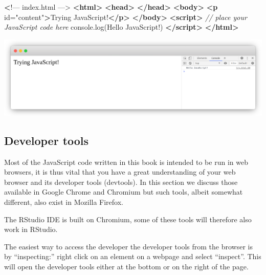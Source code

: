 \documentclass[
]{krantz}
\makeatletter
\newenvironment{Shaded}{\begin{snugshade}}{\end{snugshade}}
\newcommand{\AttributeTok}[1]{\textcolor[rgb]{0.61,0.61,0.61}{#1}}
\newcommand{\CommentTok}[1]{\textcolor[rgb]{0.37,0.37,0.37}{\textit{#1}}}
\newcommand{\ErrorTok}[1]{\textcolor[rgb]{0.14,0.14,0.14}{\textbf{#1}}}
\newcommand{\KeywordTok}[1]{\textcolor[rgb]{0.27,0.27,0.27}{\textbf{#1}}}
\newcommand{\NormalTok}[1]{#1}
\newcommand{\OtherTok}[1]{\textcolor[rgb]{0.37,0.37,0.37}{#1}}
\newcommand{\StringTok}[1]{\textcolor[rgb]{0.5,0.5,0.5}{#1}}
\newcommand{\VariableTok}[1]{\textcolor[rgb]{0,0,0}{#1}}
\newenvironment{kframe}{%
\medskip{}
\setlength{\fboxsep}{.8em}
 \def\at@end@of@kframe{}%
 \ifinner\ifhmode%
  \def\at@end@of@kframe{\end{minipage}}%
  \begin{minipage}{\columnwidth}%
 \fi\fi%
 \def\FrameCommand##1{\hskip\@totalleftmargin \hskip-\fboxsep
 \colorbox{shadecolor}{##1}\hskip-\fboxsep
     \hskip-\linewidth \hskip-\@totalleftmargin \hskip\columnwidth}%
 \MakeFramed {\advance\hsize-\width
   \@totalleftmargin\z@ \linewidth\hsize
   \@setminipage}}%
 {\par\unskip\endMakeFramed%
 \at@end@of@kframe}
\renewenvironment{Shaded}{\begin{kframe}}{\end{kframe}}
\newenvironment{rmdblock}[1]
  {
  \begin{itemize}
  \renewcommand{\labelitemi}{
    \raisebox{-.7\height}[0pt][0pt]{
      {\setkeys{Gin}{width=3em,keepaspectratio}\texttt{[image: images/\#1]}}
    }
  }
  \setlength{\fboxsep}{1em}
  \begin{kframe}
  \item
  }
  {
  \end{kframe}
  \end{itemize}
  }
\newenvironment{rmdnote}
  {\begin{rmdblock}{note}}
  {\end{rmdblock}}
\makeatother
\begin{document}
\begin{Shaded}
\begin{Highlighting}[]
\ErrorTok{<}\NormalTok{!–– index.html ––>}
\KeywordTok{<html>}
  \KeywordTok{<head>}
  \KeywordTok{</head>}
  \KeywordTok{<body>}
    \KeywordTok{<p}\OtherTok{ id=}\StringTok{"content"}\KeywordTok{>}\NormalTok{Trying JavaScript!}\KeywordTok{</p>}
  \KeywordTok{</body>}
  \KeywordTok{<script>}
    \CommentTok{// place your JavaScript code here}
    \VariableTok{console}\NormalTok{.}\AttributeTok{log}\NormalTok{(}\StringTok{\textquotesingle{}Hello JavaScript!\textquotesingle{}}\NormalTok{)}
  \KeywordTok{</script>}
\KeywordTok{</html>}
\end{Highlighting}
\end{Shaded}

\includegraphics{images/tryingjs.png}

\hypertarget{developer-tools}{%
\subsection{Developer tools}\label{developer-tools}}

Most of the JavaScript code written in this book is intended to be run in web browsers, it is thus vital that you have a great understanding of your web browser and its developer tools (devtools). In this section we discuss those available in Google Chrome and Chromium but such tools, albeit somewhat different, also exist in Mozilla Firefox.

\begin{rmdnote}
The RStudio IDE is built on Chromium, some of these tools will therefore
also work in RStudio.
\end{rmdnote}

The easiest way to access the developer the developer tools from the browser is by ``inspecting:'' right click on an element on a webpage and select ``inspect''. This will open the developer tools either at the bottom or on the right of the page.
\end{document}
